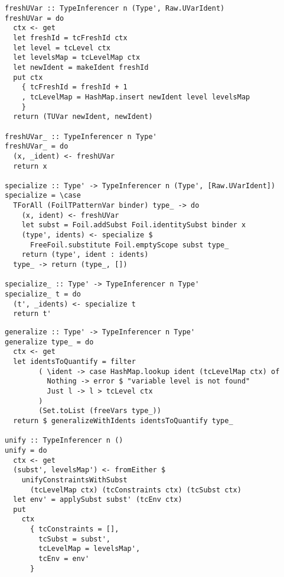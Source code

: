 \begin{verbatim}
freshUVar :: TypeInferencer n (Type', Raw.UVarIdent)
freshUVar = do
  ctx <- get
  let freshId = tcFreshId ctx
  let level = tcLevel ctx
  let levelsMap = tcLevelMap ctx
  let newIdent = makeIdent freshId
  put ctx
    { tcFreshId = freshId + 1
    , tcLevelMap = HashMap.insert newIdent level levelsMap
    }
  return (TUVar newIdent, newIdent)

freshUVar_ :: TypeInferencer n Type'
freshUVar_ = do
  (x, _ident) <- freshUVar
  return x

specialize :: Type' -> TypeInferencer n (Type', [Raw.UVarIdent])
specialize = \case
  TForAll (FoilTPatternVar binder) type_ -> do
    (x, ident) <- freshUVar
    let subst = Foil.addSubst Foil.identitySubst binder x
    (type', idents) <- specialize $
      FreeFoil.substitute Foil.emptyScope subst type_
    return (type', ident : idents)
  type_ -> return (type_, [])

specialize_ :: Type' -> TypeInferencer n Type'
specialize_ t = do
  (t', _idents) <- specialize t
  return t'
\end{verbatim}
\newpage
\begin{verbatim}
generalize :: Type' -> TypeInferencer n Type'
generalize type_ = do
  ctx <- get
  let identsToQuantify = filter
        ( \ident -> case HashMap.lookup ident (tcLevelMap ctx) of
          Nothing -> error $ "variable level is not found"
          Just l -> l > tcLevel ctx
        )
        (Set.toList (freeVars type_))
  return $ generalizeWithIdents identsToQuantify type_

unify :: TypeInferencer n ()
unify = do
  ctx <- get
  (subst', levelsMap') <- fromEither $
    unifyConstraintsWithSubst
      (tcLevelMap ctx) (tcConstraints ctx) (tcSubst ctx)
  let env' = applySubst subst' (tcEnv ctx)
  put
    ctx
      { tcConstraints = [],
        tcSubst = subst',
        tcLevelMap = levelsMap',
        tcEnv = env'
      }
\end{verbatim}
